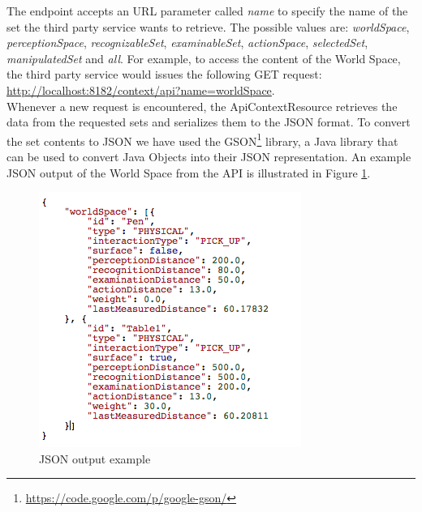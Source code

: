 The endpoint accepts an URL parameter called \emph{name} to specify the name of the set the third party service wants to retrieve. The possible values are: \emph{worldSpace}, \emph{perceptionSpace}, \emph{recognizableSet}, \emph{examinableSet}, \emph{actionSpace}, \emph{selectedSet}, \emph{manipulatedSet} and \emph{all}. For example, to access the content of the World Space, the third party service would issues the following GET request:\\
\url{http://localhost:8182/context/api?name=worldSpace}.\\

Whenever a new request is encountered, the ApiContextResource retrieves the data from the requested sets and serializes them to the JSON format. To convert the set contents to JSON we have used the GSON\footnote{\url{https://code.google.com/p/google-gson/}} library, a Java library that can be used to convert Java Objects into their JSON representation. An example JSON output of the World Space from the API is illustrated in Figure \ref{fig:impl_json_example}.
\begin{figure}[H]
	\centering
	\includegraphics[width=\linewidth]{gfx/Chapter4/json_example}
	\caption{JSON output example}
	\label{fig:impl_json_example}
\end{figure}

